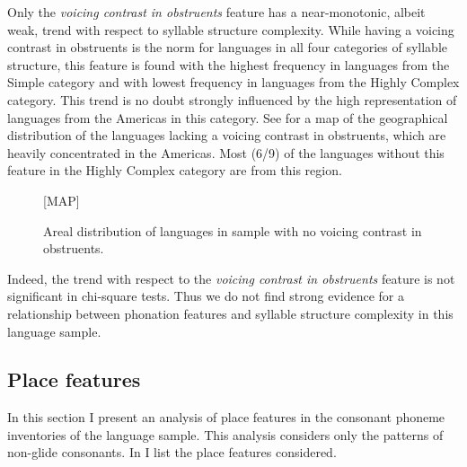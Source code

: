   Only the \textit{voicing contrast in obstruents} feature has a near-monotonic, albeit weak, trend with respect to syllable structure complexity. While having a voicing contrast in obstruents is the norm for languages in all four categories of syllable structure, this feature is found with the highest frequency in languages from the Simple category and with lowest frequency in languages from the Highly Complex category. This trend is no doubt strongly influenced by the high representation of languages from the Americas in this category. See  for a map of the geographical distribution of the languages lacking a voicing contrast in obstruents, which are heavily concentrated in the Americas. Most (6/9) of the languages without this feature in the Highly Complex category are from this region.

  
\begin{figure}
{}[MAP]

\caption{\label{fig:4.6} Areal distribution of languages in sample with no voicing contrast in obstruents.}
\end{figure}

  Indeed, the trend with respect to the \textit{voicing contrast in obstruents} feature is not significant in chi-square tests. Thus we do not find strong evidence for a relationship between phonation features and syllable structure complexity in this language sample.

\subsection{Place features}\label{sec:4.4.4}

  In this section I present an analysis of place features in the consonant phoneme inventories of the language sample. This analysis considers only the patterns of non-glide consonants. In  I list the place features considered.

